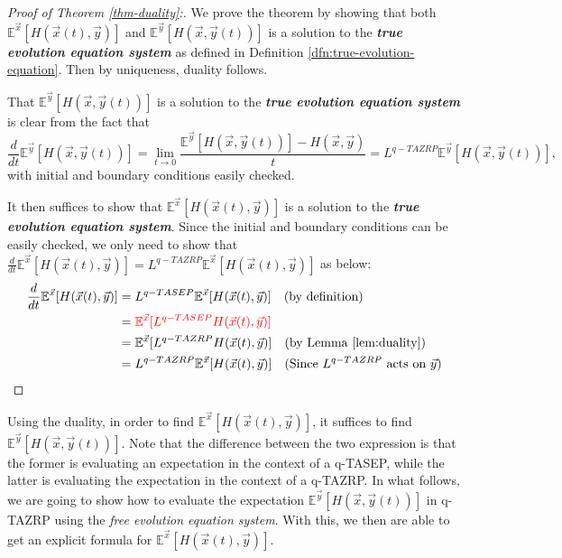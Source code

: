 \begin{proof}[Proof of Theorem \ref{thm-duality}:]
We prove the theorem by showing that both $\mathbb{E}^{\vec{x}}[H(\vec{x}(t),\vec{y})]$ and $\mathbb{E}^{\vec{y}}[H(\vec{x},\vec{y}(t))]$ is a solution to the \textbf{\emph{true evolution equation system}} as defined in Definition \ref{dfn:true-evolution-equation}. Then by uniqueness, duality follows. 

That $\mathbb{E}^{\vec{y}}[H(\vec{x},\vec{y}(t))]$ is a solution to the \textbf{\emph{true evolution equation system}} is clear from the fact that $$\frac{d}{dt}\mathbb{E}^{\vec{y}}[H(\vec{x},\vec{y}(t))] = \lim_{t \rightarrow 0} \frac{\mathbb{E}^{\vec{y}}[H(\vec{x},\vec{y}(t))] - H(\vec{x},\vec{y})}{t} = L^{q-TAZRP} \mathbb{E}^{\vec{y}}[H(\vec{x},\vec{y}(t))],$$ with initial and boundary conditions easily checked. 

It then suffices to show that $\mathbb{E}^{\vec{x}}[H(\vec{x}(t),\vec{y})]$ is a solution to the \textbf{\emph{true evolution equation system}}. Since the initial and boundary conditions can be easily checked, we only need to show that $\frac{d}{dt} \mathbb{E}^{\vec{x}}[H(\vec{x}(t),\vec{y})] = L^{q-TAZRP} \mathbb{E}^{\vec{x}}[H(\vec{x}(t),\vec{y})]$ as below:
\begin{align*}
\frac{d}{dt} \mathbb{E}^{\vec{x}}[H(\vec{x}(t),\vec{y})] &= L^{q-TASEP} \mathbb{E}^{\vec{x}}[H(\vec{x}(t),\vec{y})] \quad (\text{by definition})\\
																												 &= \textcolor{red}{\mathbb{E}^{\vec{x}} [L^{q-TASEP} H(\vec{x}(t),\vec{y})]}\\
																												 &= \mathbb{E}^{\vec{x}} [L^{q-TAZRP} H(\vec{x}(t),\vec{y})] \quad (\text{by Lemma }\ref{lem:duality}) \\
																												 &= L^{q-TAZRP} \mathbb{E}^{\vec{x}} [H(\vec{x}(t),\vec{y})] \quad (\text{Since $L^{q-TAZRP}$ acts on $\vec{y}$})
\end{align*}
\end{proof}
Using the duality, in order to find $\mathbb{E}^{\vec{x}}[H(\vec{x}(t),\vec{y})]$, it suffices to find $\mathbb{E}^{\vec{y}}[H(\vec{x},\vec{y}(t))]$. Note that the difference between the two expression is that the former is evaluating an expectation in the context of a q-TASEP, while the latter is evaluating the expectation in the context of a q-TAZRP. In what follows, we are going to show how to evaluate the expectation $\mathbb{E}^{\vec{y}}[H(\vec{x},\vec{y}(t))]$ in q-TAZRP using the \emph{free evolution equation system}. With this, we then are able to get an explicit formula for $\mathbb{E}^{\vec{x}}[H(\vec{x}(t),\vec{y})]$.
